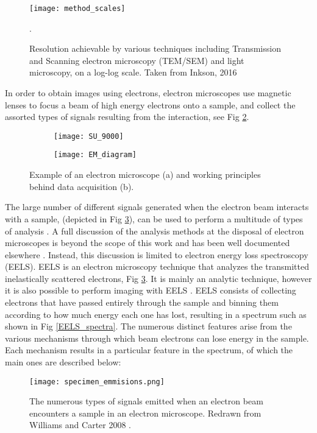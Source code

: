 \begin{figure}
	\centering
	\texttt{[image: method\_scales]}
	\caption{Resolution achievable by various techniques including Transmission and Scanning electron microscopy (TEM/SEM) and light microscopy, on a log-log scale.  Taken from Inkson, 2016 \cite{inkson_2_2016}}.
	\label{method_scales}
	
\end{figure}


In order to obtain images using electrons, electron microscopes use magnetic lenses to focus a beam of high energy electrons onto a sample, and collect the assorted types of signals resulting from the interaction, see Fig \ref{em_diagram}.\\


\begin{figure}
\begin{subfigure}{0.45\textwidth}
	\texttt{[image: SU\_9000]}
	\caption{}
\end{subfigure}
\hspace{0.05cm}
\begin{subfigure}{0.45\textwidth}
	\texttt{[image: EM\_diagram]}
	\caption{}
\end{subfigure}
	\caption{Example of an electron microscope (a) and working principles behind data acquisition (b). }
	\label{em_diagram}
\end{figure}

The large number of different signals generated when the electron beam interacts with a sample, (depicted in Fig \ref{specimen_emmisions}), can be used to perform a multitude of types of analysis \cite{williams_transmission_2008}.  A full discussion of the analysis methods at the disposal of electron microscopes is beyond the scope of this work and has been well documented elsewhere \cite{goldstein_electron_2003,Egerton,williams_transmission_2008,reimer_electron_1998}.  Instead, this discussion is limited to electron energy loss spectroscopy (EELS).  EELS is an electron microscopy technique that analyzes the transmitted inelastically scattered electrons, Fig \ref{specimen_emmisions}\cite{Egerton}.  It is mainly an analytic technique, however it is also possible to perform imaging with EELS \cite{varela_stem-eels_2012}.  EELS consists of collecting electrons that have passed entirely through the sample and binning them according to how much energy each one has lost, resulting in a spectrum such as shown in Fig \ref{EELS_spectra}.  The numerous distinct features arise from the various mechanisms through which beam electrons can lose energy in the sample.  Each mechanism results in a particular feature in the spectrum, of which the main ones are described below:
\begin{figure}
	\centering
	\texttt{[image: specimen\_emmisions.png]}
	\caption{The numerous types of signals emitted when an electron beam encounters a sample in an electron microscope.   Redrawn from Williams and Carter 2008 \cite{williams_transmission_2008}.  }
	\label{specimen_emmisions}
\end{figure}

